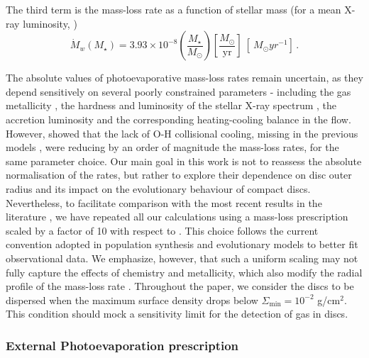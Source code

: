 \documentclass[fleqn,usenatbib]{mnras}
\begin{document}
The third term is the mass-loss rate as a function of stellar mass (for a mean X-ray luminosity, \citet{2021MNRAS.508.3611P})
\begin{equation}\label{eq:mdotmstar}
    \dot{M}_w(M_\star) = 3.93\times10^{-8} \left(\frac{M_\star}{M_\odot}\right) \left[\frac{M_\odot}{\mathrm{yr}}\right] \ [\SI{}{M_\odot yr^{-1}}]\,.
\end{equation}

The absolute values of photoevaporative mass-loss rates remain uncertain, as they depend sensitively on several poorly constrained parameters - including the gas metallicity \citep[see e.g.][who show that modest C depletions within the discs can lead to order magnitude increase in mass loss rates]{2019MNRAS.490.5596W}, the hardness and luminosity of the stellar X-ray spectrum \citep{2021MNRAS.508.1675E}, the accretion luminosity and the corresponding heating-cooling balance in the flow.
However, \citet{2024A&A...690A.296S} showed that the lack of O-H collisional cooling, missing in the previous models \citep{2012MNRAS.422.1880O, 2019MNRAS.487..691P}, were reducing by an order of magnitude the mass-loss rates, for the same parameter choice.
Our main goal in this work is not to reassess the absolute normalisation of the rates, but rather to explore their dependence on disc outer radius and its impact on the evolutionary behaviour of compact discs.
Nevertheless, to facilitate comparison with the most recent results in the literature \citep[e.g.][]{2024A&A...690A.296S}, we have repeated all our calculations using a mass-loss prescription scaled by a factor of 10 with respect to \citet{2019MNRAS.487..691P}.
This choice follows the current convention adopted in population synthesis and evolutionary models to better fit observational data. We emphasize, however, that such a uniform scaling may not fully capture the effects of chemistry and metallicity, which also modify the radial profile of the mass-loss rate \citep{2019MNRAS.490.5596W,2024A&A...690A.296S}.
Throughout the paper, we consider the discs to be dispersed when the maximum surface density drops below $\Sigma_\mathrm{min} = 10^{-2}$ g/cm$^2$. This condition should mock a sensitivity limit for the detection of gas in discs.

\subsubsection{External Photoevaporation prescription}
\end{document}
